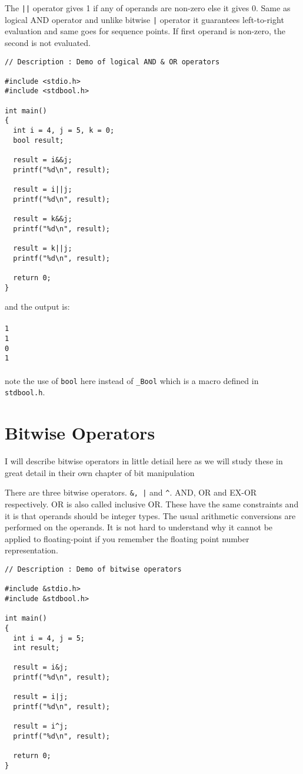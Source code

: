 The \texttt{||} operator gives 1 if any of operands are non-zero else it gives
0. Same as logical AND operator and unlike bitwise \texttt{|} operator it
guarantees left-to-right evaluation and same goes for sequence points. If first
operand is non-zero, the second is not evaluated.

\begin{verbatim}
// Description : Demo of logical AND & OR operators

#include <stdio.h>
#include <stdbool.h>

int main()
{
  int i = 4, j = 5, k = 0;
  bool result;

  result = i&&j;
  printf("%d\n", result);

  result = i||j;
  printf("%d\n", result);

  result = k&&j;
  printf("%d\n", result);

  result = k||j;
  printf("%d\n", result);

  return 0;
}
\end{verbatim}
and the output is:
\\\\\texttt{1\\
1\\
0\\
1\\\\}
note the use of \texttt{bool} here instead of \texttt{\_Bool} which is a macro
defined in \texttt{stdbool.h}.

\section{Bitwise Operators}
I will describe bitwise operators in little detiail here as we will study these
in great detail in their own chapter of bit manipulation

There are three bitwise operators. \texttt{\&, |} and
\texttt{\textasciicircum{}}. AND, OR and EX-OR respectively. OR is also called
inclusive OR. These have the same constraints and it is that operands should be
integer types. The usual arithmetic conversions are performed on the
operands. It is not hard to understand why it cannot be applied to
floating-point if you remember the floating point number representation. 

\begin{verbatim}
// Description : Demo of bitwise operators

#include &stdio.h>
#include &stdbool.h>

int main()
{
  int i = 4, j = 5;
  int result;

  result = i&j;
  printf("%d\n", result);

  result = i|j;
  printf("%d\n", result);

  result = i^j;
  printf("%d\n", result);

  return 0;
}
\end{verbatim}

